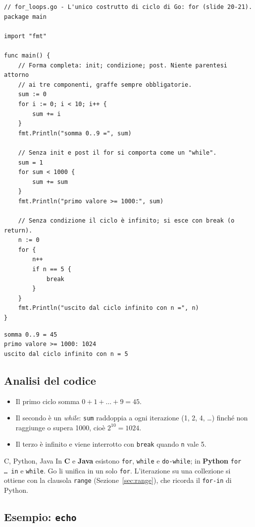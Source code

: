 \documentclass[11pt,a4paper]{report}
\newcommand{\cod}[1]{\texttt{#1}}
\begin{document}
\begin{lstlisting}[style=gocode,caption={\texttt{03\_control\_flow/for\_loops.go}}]
// for_loops.go - L'unico costrutto di ciclo di Go: for (slide 20-21).
package main

import "fmt"

func main() {
	// Forma completa: init; condizione; post. Niente parentesi attorno
	// ai tre componenti, graffe sempre obbligatorie.
	sum := 0
	for i := 0; i < 10; i++ {
		sum += i
	}
	fmt.Println("somma 0..9 =", sum)

	// Senza init e post il for si comporta come un "while".
	sum = 1
	for sum < 1000 {
		sum += sum
	}
	fmt.Println("primo valore >= 1000:", sum)

	// Senza condizione il ciclo è infinito; si esce con break (o return).
	n := 0
	for {
		n++
		if n == 5 {
			break
		}
	}
	fmt.Println("uscito dal ciclo infinito con n =", n)
}
\end{lstlisting}
\begin{lstlisting}[style=output]
somma 0..9 = 45
primo valore >= 1000: 1024
uscito dal ciclo infinito con n = 5
\end{lstlisting}

\subsection{Analisi del codice}

\begin{itemize}
  \item Il primo ciclo somma $0+1+\dots+9=45$.
  \item Il secondo è un \emph{while}: \cod{sum} raddoppia a ogni iterazione
        (1, 2, 4, \ldots) finché non raggiunge o supera 1000, cioè
        $2^{10}=1024$.
  \item Il terzo è infinito e viene interrotto con \cod{break} quando
        \cod{n} vale 5.
\end{itemize}

\begin{confronto}{C, Python, Java}
In \textbf{C} e \textbf{Java} esistono \cod{for}, \cod{while} e \cod{do-while};
in \textbf{Python} \cod{for \ldots\ in} e \cod{while}. Go li unifica in un solo
\cod{for}. L'iterazione su una collezione si ottiene con la clausola
\cod{range} (Sezione~\ref{sec:range}), che ricorda il \cod{for-in} di Python.
\end{confronto}

\subsection{Esempio: \texttt{echo}}
\end{document}
